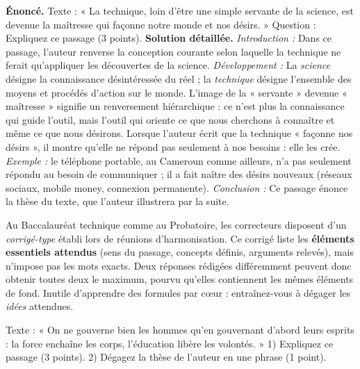 \documentclass[11pt]{article}
\begin{document}
\begin{exoresolu}
\textbf{Énoncé.} Texte : « La technique, loin d'être une simple servante de la science, est devenue la maîtresse qui façonne notre monde et nos désirs. » Question : Expliquez ce passage (3 points).
\tcblower
\textbf{Solution détaillée.} \emph{Introduction :} Dans ce passage, l'auteur renverse la conception courante selon laquelle la technique ne ferait qu'appliquer les découvertes de la science. \emph{Développement :} La \emph{science} désigne la connaissance désintéressée du réel ; la \emph{technique} désigne l'ensemble des moyens et procédés d'action sur le monde. L'image de la « servante » devenue « maîtresse » signifie un renversement hiérarchique : ce n'est plus la connaissance qui guide l'outil, mais l'outil qui oriente ce que nous cherchons à connaître et même ce que nous désirons. Lorsque l'auteur écrit que la technique « façonne nos désirs », il montre qu'elle ne répond pas seulement à nos besoins : elle les crée. \emph{Exemple :} le téléphone portable, au Cameroun comme ailleurs, n'a pas seulement répondu au besoin de communiquer ; il a fait naître des désirs nouveaux (réseaux sociaux, mobile money, connexion permanente). \emph{Conclusion :} Ce passage énonce la thèse du texte, que l'auteur illustrera par la suite.
\end{exoresolu}

\begin{savaistu}
Au Baccalauréat technique comme au Probatoire, les correcteurs disposent d'un \emph{corrigé-type} établi lors de réunions d'harmonisation. Ce corrigé liste les \textbf{éléments essentiels attendus} (sens du passage, concepts définis, arguments relevés), mais n'impose pas les mots exacts. Deux réponses rédigées différemment peuvent donc obtenir toutes deux le maximum, pourvu qu'elles contiennent les mêmes éléments de fond. Inutile d'apprendre des formules par cœur : entraînez-vous à dégager les \emph{idées} attendues.
\end{savaistu}

\begin{exercice}
Texte : « On ne gouverne bien les hommes qu'en gouvernant d'abord leurs esprits : la force enchaîne les corps, l'éducation libère les volontés. » 1) Expliquez ce passage (3 points). 2) Dégagez la thèse de l'auteur en une phrase (1 point).
\end{exercice}
\end{document}
